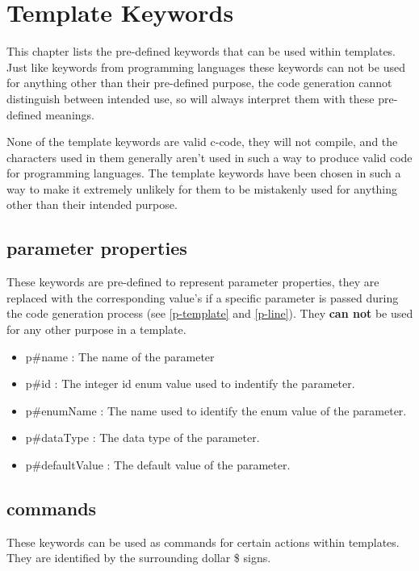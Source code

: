 \documentclass{settings/TU_Delft_Report}
\begin{document}
\section{Template Keywords}
This chapter lists the pre-defined keywords that can be used within templates. Just like keywords from programming languages these keywords can not be used for anything other than their pre-defined purpose, the code generation cannot distinguish between intended use, so will always interpret them with these pre-defined meanings.

None of the template keywords are valid c-code, they will not compile, and the characters used in them generally aren't used in such a way to produce valid code for programming languages. The template keywords have been chosen in such a way to make it extremely unlikely for them to be mistakenly used for anything other than their intended purpose.

\subsection{parameter properties} \label{par-keywords}
These keywords are pre-defined to represent parameter properties, they are replaced with the corresponding value's if a specific parameter is passed during the code generation process (see \ref{p-template} and \ref{p-line}). They \textbf{can not} be used for any other purpose in a template.
\begin{itemize}
    \item p\#name : The name of the parameter
    \item p\#id : The integer id enum value used to indentify the parameter.
    \item p\#enumName : The name used to identify the enum value of the parameter.
    \item p\#dataType : The data type of the parameter.
    \item p\#defaultValue : The default value of the parameter.
\end{itemize}

\subsection{commands}
These keywords can be used as commands for certain actions within templates. They are identified by the surrounding dollar \$ signs.
\end{document}
